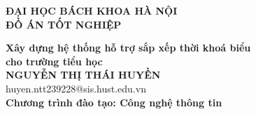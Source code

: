 \documentclass[DoAn.tex]{subfiles}
\begin{document}
\begin{titlepage}
\thispagestyle{empty}
\begin{center}

{\textbf{\large{ĐẠI HỌC BÁCH KHOA HÀ NỘI}}}\\[4cm]

{\textbf{\huge{ĐỒ ÁN TỐT NGHIỆP}}}\\[1cm]
{\textbf{\Large{Xây dựng hệ thống hỗ trợ sắp xếp thời khoá biểu\\cho trường tiểu học}}\\[1cm]

{\textbf{\large{NGUYỄN THỊ THÁI HUYỀN}}}\\
{\large{huyen.ntt239228@sis.hust.edu.vn}}\\[0.5cm]

{\textbf{\large{Chương trình đào tạo: Công nghệ thông tin}}}\\

\vspace{3cm}
\begin{table}[H]
\centering
{}
\end{table}}
\end{center}



\end{titlepage}
\end{document}
